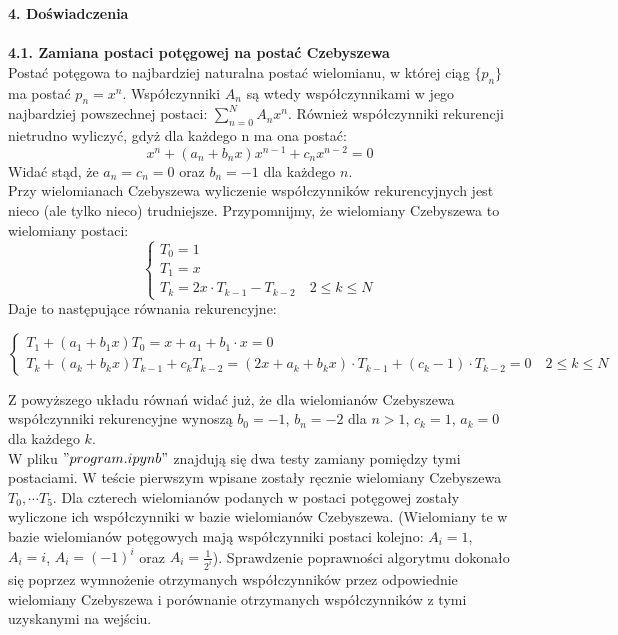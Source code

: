 \documentclass[a4paper]{article}
\begin{document}
\Large
\textbf{4. Doświadczenia}\\\\
\large
\textbf{4.1. Zamiana postaci potęgowej na postać Czebyszewa}\\
\normalsize
Postać potęgowa to najbardziej naturalna postać wielomianu, w której ciąg $\{p_n\}$ ma postać $ p_n = x^n$. Współczynniki $A_n$ są wtedy współczynnikami w jego najbardziej powszechnej postaci: $\sum_{n=0}^{N} A_n x^n$. Również współczynniki rekurencji nietrudno wyliczyć, gdyż dla każdego n ma ona postać:
$$x^n + (a_n + b_nx)x^{n-1} + c_n x^{n-2} = 0$$
Widać stąd, że $a_n = c_n = 0$ oraz $b_n = -1$ dla każdego $n$.\\
Przy wielomianach Czebyszewa wyliczenie współczynników rekurencyjnych jest nieco (ale tylko nieco) trudniejsze. Przypomnijmy, że wielomiany Czebyszewa to wielomiany postaci:
\begin{equation}\label{Czebyszew}
\begin{cases}
T_0 = 1\\
T_1 = x\\
T_k = 2x \cdot T_{k-1} - T_{k-2} \quad 2\leq k \leq N
\end{cases}
\end{equation}
Daje to następujące równania rekurencyjne:\\
\begin{center}
$\begin{cases}
T_1 + (a_1 + b_1x)T_0 = x + a_1 + b_1 \cdot x = 0\\
T_k + (a_k + b_kx)T_{k-1} + c_k T_{k-2} = (2x + a_k + b_kx) \cdot T_{k-1} + (c_k - 1) \cdot T_{k-2} = 0 \quad 2\leq k \leq N
\end{cases}$
\end{center}
Z powyższego układu równań widać już, że dla wielomianów Czebyszewa współczynniki rekurencyjne wynoszą $b_0 = -1$, $b_n = -2$ dla $n>1$, $c_k = 1$, $a_k = 0$ dla każdego $k$.\\

W pliku $"program.ipynb"$ znajdują się dwa testy zamiany pomiędzy tymi postaciami. W teście pierwszym wpisane zostały ręcznie wielomiany Czebyszewa $T_0, \cdots T_5$. Dla czterech wielomianów podanych w postaci potęgowej zostały wyliczone ich współczynniki w bazie wielomianów Czebyszewa. (Wielomiany te w bazie wielomianów potęgowych mają współczynniki postaci kolejno: $A_i = 1$, $A_i = i$, $A_i = (-1)^i$ oraz $A_i = \frac{1}{2^i}$). Sprawdzenie poprawności algorytmu dokonało się poprzez wymnożenie otrzymanych współczynników przez odpowiednie wielomiany Czebyszewa i porównanie otrzymanych współczynników z tymi uzyskanymi na wejściu.\\ 
\end{document}
